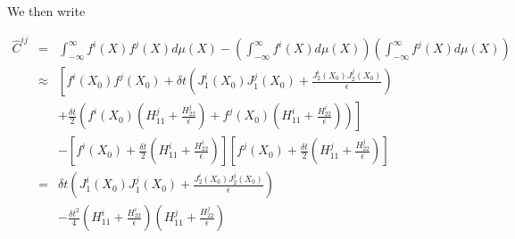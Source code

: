 \documentclass[12pt]{article}
\begin{document}

We then write

\begin{eqnarray}
\hat{C}^{ij} &=& \int_{-\infty}^{\infty} f^i(X) f^j(X) d\mu(X) - \left(\int_{-\infty}^{\infty} f^i(X) d\mu(X) \right) \left(\int_{-\infty}^{\infty} f^j(X) d\mu(X) \right) \\
&\approx & \left[  f^i(X_0) f^j(X_0) + \delta t \left( J_1^i(X_0) J_1^j(X_0) + \frac{J_2^i(X_0) J_2^j(X_0)}{\epsilon}  \right) \right .\\
&& \left. + \frac{\delta t}{2}  \left( f^i(X_0) \left( H^j_{11} + \frac{H^j_{22}}{\epsilon} \right) + f^j(X_0) \left( H^i_{11} + \frac{H^i_{22}}{\epsilon} \right) \right) \right] \\
&& - \left[ f^i(X_0) + \frac{\delta t}{2} \left( H^i_{11} + \frac{H^i_{22}}{\epsilon} \right)  \right] 
\left[ f^j(X_0) + \frac{\delta t}{2} \left( H^j_{11} + \frac{H^j_{22}}{\epsilon} \right) \right] \\
&=& \delta t \left( J_1^i(X_0) J_1^j(X_0) + \frac{J_2^i(X_0) J_2^j(X_0)}{\epsilon}  \right) \\
&& - \frac{\delta t^2}{4} \left( H^i_{11} + \frac{H^i_{22}}{\epsilon} \right) \left( H^j_{11} + \frac{H^j_{22}}{\epsilon} \right)
\end{eqnarray}
\end{document}
